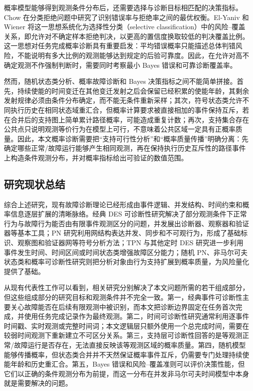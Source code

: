 \documentclass[master,fontset=ubuntu]{shnuthesis}
\theoremstyle{definition}
\begin{document}
概率模型能够得到观测条件分布后，还需要选择与诊断目标相匹配的决策指标。Chow 在分类拒绝问题中研究了识别错误率与拒绝率之间的最优权衡\cite{Chow1970}。El-Yaniv 和 Wiener 将这一思想系统化为选择性分类（selective classification）中的风险--覆盖关系，即允许对不确定样本拒绝判决，以更高的置信度换取较低的判决覆盖比例\cite{ElYaniv2010}。这一思想对任务完成概率诊断具有重要启发：平均错误概率只能描述总体判错风险，不能说明有多大比例的观测能够达到规定的后验可靠度。因此，在允许对高不确定观测不作强制判断时，需要同时考察最小 Bayes 错误和可靠诊断覆盖率。

然而，随机状态类分析、概率故障诊断和 Bayes 决策指标之间不能简单拼接。首先，持续使能的时间变迁在其他变迁发射之后会保留已经积累的使能年龄，其剩余发射规律必须由条件分布确定，而不能无条件重新采样；其次，符号状态类允许不同执行历史在相同状态域重汇合，但概率计算要求被直接相加的事件保持互斥，若在合并后的支持图上简单累计路径概率，可能造成重复计数；再次，支持集合存在公共点只说明观测等价行为在模型上可行，不意味着公共区域一定具有正概率质量。因此，本文概率诊断需要把“支持可行性分析”和“概率质量传播”明确分离：先确定哪些正常/故障运行能够产生相同观测，再在保持执行历史互斥性的路径事件上构造条件观测分布，并对概率指标给出可验证的数值范围。

\subsection{研究现状总结}

综合上述研究，现有故障诊断理论已经形成由事件逻辑、并发结构、时间约束和概率信息逐层扩展的清晰脉络。经典 DES 可诊断性研究解决了部分观测条件下正常行为与故障行为能否由有限事件观测区分的问题，并发展出诊断器、观察器和验证器等基本工具；PN 研究利用网结构表达并发、同步和不可观行为，形成了基础标识、观察图和验证器网等符号分析方法；TPN 与其他定时 DES 研究进一步利用事件发生时间、时间区间或时间状态类增强故障区分能力；随机 PN、非马尔可夫状态类和概率可诊断性研究则把分析对象由行为支持扩展到概率质量，为风险量化提供了基础。

从现有代表性工作可以看到，相关研究分别解决了本文问题所需的若干组成部分，但这些组成部分的研究目标和观测条件并不完全一致。第一，经典事件可诊断性主要关心故障能否在后续有限观测中被识别，而本文把诊断边界固定在任务首次完成，并使用任务完成记录作为最终观测。第二，时间可诊断性研究通常利用逐事件时间戳、实时观测或完整时间词；本文逻辑层只额外使用一个总完成时间，需要在较弱时间观测下重新建立不可区分关系。第三，支持层可诊断性回答的是等观测正常/故障运行是否存在，无法直接反映该等观测区域的概率质量。第四，随机模型能够传播概率，但状态类合并并不天然保证概率事件互斥，仍需要专门处理持续使能年龄和历史重汇合。第五，Bayes 错误和风险--覆盖准则可以评价决策性能，但它们以正确的条件观测分布为前提，而这一分布在并发非马尔可夫时间模型中本身就是需要解决的问题。
\end{document}

